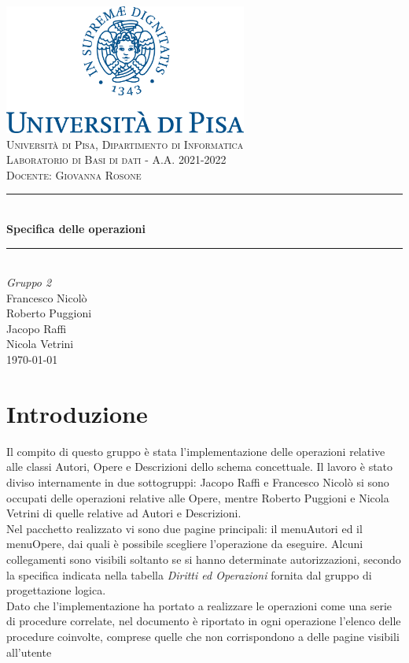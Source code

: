 \documentclass[a4paper,11pt]{article}
\newcommand{\HRule}{\rule{\linewidth}{0.5mm}} 	%
\begin{document}
\begin{titlepage}
\center
\includegraphics[width=0.6\textwidth]{img/unipi-logo.png}\\[1cm]

\textsc{\LARGE Università di Pisa, Dipartimento di Informatica}\\[1cm]

\textsc{\Large Laboratorio di Basi di dati - A.A. 2021-2022}\\[0.2cm]
\textsc{\large Docente: Giovanna Rosone}\\[1cm]

\HRule \\[0.8cm]
{ \huge \bfseries Specifica delle operazioni}\\[0.7cm]
\HRule \\[2cm]

\Huge \emph{Gruppo 2}\\[0.5cm]
\large Francesco Nicolò\\Roberto Puggioni\\Jacopo Raffi\\Nicola Vetrini\\[1.5cm]
{\large \today}\\[5cm]

\vfill
\end{titlepage}

\clearpage
\tableofcontents
\clearpage

\section{Introduzione}
Il compito di questo gruppo è stata l'implementazione delle operazioni relative alle classi Autori, Opere e Descrizioni dello schema concettuale. Il lavoro è stato diviso internamente in due sottogruppi: Jacopo Raffi e Francesco Nicolò si sono occupati delle operazioni relative alle Opere, mentre Roberto Puggioni e Nicola Vetrini di quelle relative ad Autori e Descrizioni.\\
Nel pacchetto realizzato vi sono due pagine principali: il menuAutori ed il menuOpere, dai
quali è possibile scegliere l'operazione da eseguire. Alcuni collegamenti sono visibili soltanto se si hanno determinate autorizzazioni, secondo la specifica indicata nella tabella \textit{Diritti ed Operazioni} fornita dal gruppo di progettazione logica.\\
Dato che l'implementazione ha portato a realizzare le operazioni come una serie di procedure correlate, nel documento è riportato in ogni operazione l'elenco delle procedure
coinvolte, comprese quelle che non corrispondono a delle pagine visibili all'utente


\clearpage


\clearpage


\end{document}
